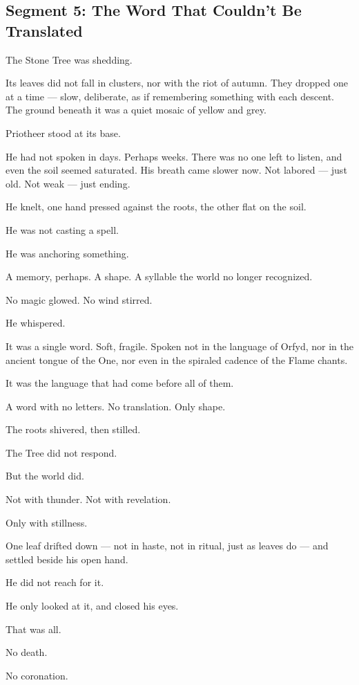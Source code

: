 \documentclass[9pt]{article}
\begin{document}
\newpage

\subsection*{Segment 5: The Word That Couldn’t Be Translated}

The Stone Tree was shedding.

Its leaves did not fall in clusters, nor with the riot of autumn. They dropped one at a time — slow, deliberate, as if remembering something with each descent. The ground beneath it was a quiet mosaic of yellow and grey.

Priotheer stood at its base.

He had not spoken in days. Perhaps weeks. There was no one left to listen, and even the soil seemed saturated. His breath came slower now. Not labored — just old. Not weak — just ending.

He knelt, one hand pressed against the roots, the other flat on the soil.

He was not casting a spell.

He was anchoring something.

A memory, perhaps. A shape. A syllable the world no longer recognized.

No magic glowed. No wind stirred.

He whispered.

It was a single word. Soft, fragile. Spoken not in the language of Orfyd, nor in the ancient tongue of the One, nor even in the spiraled cadence of the Flame chants.

It was the language that had come before all of them.

A word with no letters. No translation. Only shape.

The roots shivered, then stilled.

The Tree did not respond.

But the world did.

Not with thunder. Not with revelation.

Only with stillness.

One leaf drifted down — not in haste, not in ritual, just as leaves do — and settled beside his open hand.

He did not reach for it.

He only looked at it, and closed his eyes.

That was all.

No death.

No coronation.
\end{document}

